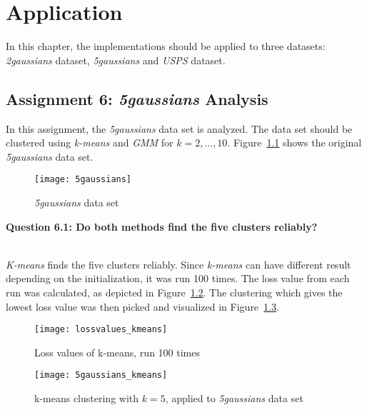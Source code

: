 \chapter{Application}
\label{chap:application}

In this chapter, the implementations should be applied to three datasets: \textit{2gaussians} dataset, \textit{5gaussians} and \textit{USPS} dataset.

\section{Assignment 6: \textit{5gaussians} Analysis}
\label{assignment6}

In this assignment, the \textit{5gaussians} data set is analyzed. The data set should be clustered using \textit{k-means} and \textit{GMM} for $k = 2, ..., 10$. Figure~\ref{fig:5gaussians} shows the original \textit{5gaussians} data set.

\begin{figure}[h!]
	\centering
	\texttt{[image: 5gaussians]}
	\caption{\textit{5gaussians} data set}
	\label{fig:5gaussians}
\end{figure}

{\raggedright \textbf{Question 6.1: Do both methods find the five clusters reliably?}} \\
\textit{K-means} finds the five clusters reliably. Since \textit{k-means} can have different result depending on the initialization, it was run 100 times. The loss value from each run was calculated, as depicted in Figure~\ref{fig:lossvalues_kmeans}. The clustering which gives the lowest loss value was then picked and visualized in Figure~\ref{fig:5gaussians_kmeans}.

\begin{figure}[h!]
	\centering
	\texttt{[image: lossvalues\_kmeans]}
	\caption{Loss values of k-means, run 100 times}
	\label{fig:lossvalues_kmeans}
\end{figure}

\begin{figure}[h!]
	\centering
	\texttt{[image: 5gaussians\_kmeans]}
	\caption{k-means clustering with $k=5$, applied to \textit{5gaussians} data set}
	\label{fig:5gaussians_kmeans}
\end{figure}

